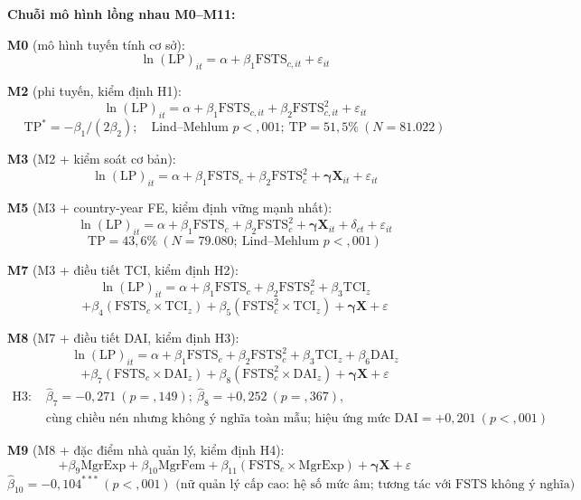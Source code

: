 \documentclass[
  a4paper,
  13pt]{extreport}
\begin{document}
\textbf{Chuỗi mô hình lồng nhau M0--M11:}

\textbf{M0} (mô hình tuyến tính cơ sở):
\[\ln(\mathrm{LP})_{it} = \alpha + \beta_1 \mathrm{FSTS}_{c,it} + \varepsilon_{it}\]

\textbf{M2} (phi tuyến, kiểm định H1):
\[\ln(\mathrm{LP})_{it} = \alpha + \beta_1 \mathrm{FSTS}_{c,it} + \beta_2 \mathrm{FSTS}_{c,it}^{2} + \varepsilon_{it}\]
\[\mathrm{TP}^{*} = -\beta_1 / (2\beta_2); \quad \text{Lind–Mehlum } p < {,}001;\ \mathrm{TP} = 51{,}5\%\ (N = 81.022)\]

\textbf{M3} (M2 + kiểm soát cơ bản):
\[\ln(\mathrm{LP})_{it} = \alpha + \beta_1 \mathrm{FSTS}_{c} + \beta_2 \mathrm{FSTS}_{c}^{2} + \boldsymbol{\gamma}\mathbf{X}_{it} + \varepsilon_{it}\]

\textbf{M5} (M3 + country-year FE, kiểm định vững mạnh nhất):
\[\ln(\mathrm{LP})_{it} = \alpha + \beta_1 \mathrm{FSTS}_{c} + \beta_2 \mathrm{FSTS}_{c}^{2} + \boldsymbol{\gamma}\mathbf{X}_{it} + \delta_{ct} + \varepsilon_{it}\]
\[\mathrm{TP} = 43{,}6\%\ (N = 79.080;\ \text{Lind–Mehlum } p < {,}001)\]

\textbf{M7} (M3 + điều tiết TCI, kiểm định H2):
\[\ln(\mathrm{LP})_{it} = \alpha + \beta_1 \mathrm{FSTS}_{c} + \beta_2 \mathrm{FSTS}_{c}^{2} + \beta_3 \mathrm{TCI}_{z}\]
\[+ \beta_4 (\mathrm{FSTS}_{c} \times \mathrm{TCI}_{z}) + \beta_5 (\mathrm{FSTS}_{c}^{2} \times \mathrm{TCI}_{z}) + \boldsymbol{\gamma}\mathbf{X} + \varepsilon\]

\textbf{M8} (M7 + điều tiết DAI, kiểm định H3):
\[\ln(\mathrm{LP})_{it} = \alpha + \beta_1 \mathrm{FSTS}_{c} + \beta_2 \mathrm{FSTS}_{c}^{2} + \beta_3 \mathrm{TCI}_{z} + \beta_6 \mathrm{DAI}_{z}\]
\[+ \beta_7 (\mathrm{FSTS}_{c} \times \mathrm{DAI}_{z}) + \beta_8 (\mathrm{FSTS}_{c}^{2} \times \mathrm{DAI}_{z}) + \boldsymbol{\gamma}\mathbf{X} + \varepsilon\]
\[\begin{aligned}
\text{H3: } & \hat\beta_7 = -0{,}271\ (p = {,}149);\ \hat\beta_8 = +0{,}252\ (p = {,}367), \\
& \text{cùng chiều nén nhưng không ý nghĩa toàn mẫu; hiệu ứng mức DAI} = +0{,}201\ (p < {,}001)
\end{aligned}\]

\textbf{M9} (M8 + đặc điểm nhà quản lý, kiểm định H4):
\[+ \beta_9 \mathrm{MgrExp} + \beta_{10} \mathrm{MgrFem} + \beta_{11}(\mathrm{FSTS}_{c} \times \mathrm{MgrExp}) + \boldsymbol{\gamma}\mathbf{X} + \varepsilon\]
\[\hat\beta_{10} = -0{,}104^{***} \ (p < {,}001) \text{ (nữ quản lý cấp cao: hệ số mức âm; tương tác với FSTS không ý nghĩa)}\]
\end{document}
